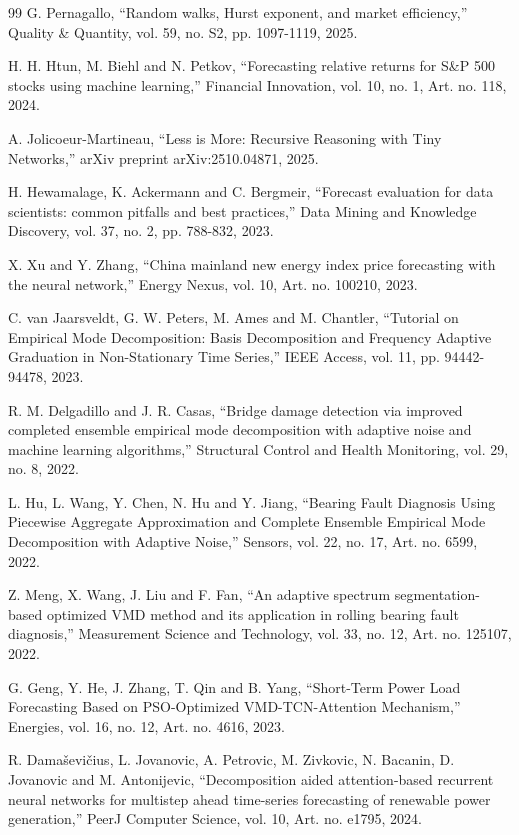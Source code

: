 \documentclass[pdflatex,sn-mathphys-num]{sn-jnl}%
\theoremstyle{thmstyleone}%
\theoremstyle{thmstyletwo}%
\theoremstyle{thmstylethree}%
\begin{document}
\begin{thebibliography}{99}
 G. Pernagallo, ``Random walks, Hurst exponent, and market efficiency,'' Quality \&
Quantity, vol. 59, no. S2, pp. 1097-1119, 2025.

 H. H. Htun, M. Biehl and N. Petkov, ``Forecasting relative returns for S\&P 500 stocks
using machine learning,'' Financial Innovation, vol. 10, no. 1, Art. no. 118, 2024.

 A. Jolicoeur-Martineau, ``Less is More: Recursive Reasoning with Tiny Networks,''
arXiv preprint arXiv:2510.04871, 2025.

 H. Hewamalage, K. Ackermann and C. Bergmeir, ``Forecast evaluation for data
scientists: common pitfalls and best practices,'' Data Mining and Knowledge Discovery,
vol. 37, no. 2, pp. 788-832, 2023.

 X. Xu and Y. Zhang, ``China mainland new energy index price forecasting with the
neural network,'' Energy Nexus, vol. 10, Art. no. 100210, 2023.

 C. van Jaarsveldt, G. W. Peters, M. Ames and M. Chantler, ``Tutorial on Empirical Mode
Decomposition: Basis Decomposition and Frequency Adaptive Graduation in Non-Stationary
Time Series,'' IEEE Access, vol. 11, pp. 94442-94478, 2023.

 R. M. Delgadillo and J. R. Casas, ``Bridge damage detection via improved completed
ensemble empirical mode decomposition with adaptive noise and machine learning
algorithms,'' Structural Control and Health Monitoring, vol. 29, no. 8, 2022.

 L. Hu, L. Wang, Y. Chen, N. Hu and Y. Jiang, ``Bearing Fault Diagnosis Using Piecewise
Aggregate Approximation and Complete Ensemble Empirical Mode Decomposition with
Adaptive Noise,'' Sensors, vol. 22, no. 17, Art. no. 6599, 2022.

 Z. Meng, X. Wang, J. Liu and F. Fan, ``An adaptive spectrum segmentation-based
optimized VMD method and its application in rolling bearing fault diagnosis,''
Measurement Science and Technology, vol. 33, no. 12, Art. no. 125107, 2022.

 G. Geng, Y. He, J. Zhang, T. Qin and B. Yang, ``Short-Term Power Load Forecasting
Based on PSO-Optimized VMD-TCN-Attention Mechanism,'' Energies, vol. 16, no. 12, Art.
no. 4616, 2023.

 R. Dama\v{s}evi\v{c}ius, L. Jovanovic, A. Petrovic, M. Zivkovic, N. Bacanin, D.
Jovanovic and M. Antonijevic, ``Decomposition aided attention-based recurrent neural
networks for multistep ahead time-series forecasting of renewable power generation,''
PeerJ Computer Science, vol. 10, Art. no. e1795, 2024.


\end{thebibliography}
\end{document}
